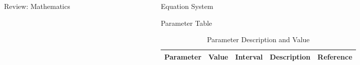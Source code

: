 \begin{frame}[t]
\begin{columns}[t]
\begin{column}{\onecolwid}
\begin{alertblock}{Review: Mathematics}
\end{alertblock}
\end{column}
\begin{column}{\onecolwid} %
\begin{alertblock}{Equation System}
\end{alertblock}
\begin{alertblock}{Parameter Table}

\vspace{4pt}
\centering
\begin{table}[h]\footnotesize
	\caption{Parameter Description and Value}
	\begin{tabular}{rllp{2cm}l}
		\hline	
		Parameter & Value & Interval & Description & Reference \\
		\hline 
	\end{tabular}	
\end{table}


\end{alertblock}
\end{column}
\end{columns}
\end{frame}
